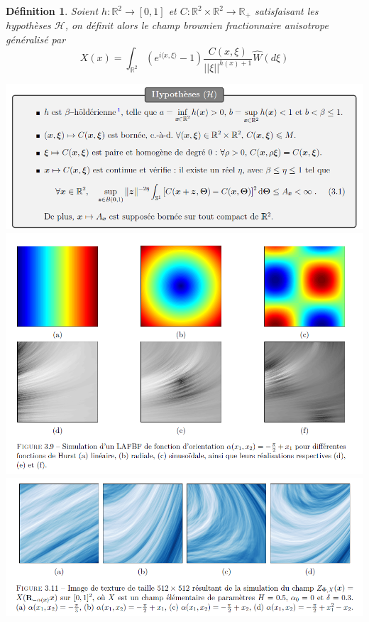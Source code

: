 \documentclass[11pt]{article} %
\newtheorem{definition}{Définition}[section]
\begin{document}
	\begin{definition}
		Soient $h:\mathbb{R}^2 \to [0,1]$ et $C:\mathbb{R}^2\times\mathbb{R}^2 \to\mathbb{R}_+$ satisfaisant les hypothèses $\mathcal{H}$, on définit alors le champ brownien fractionnaire anisotrope généralisé par
	\begin{equation}
		X(x) = \int_{\mathbb{R}^2} (e^{i\langle x, \xi\rangle} - 1) \frac{C(x,\xi)}{||\xi||^{h(x) + 1}} \hat{W}(d\xi)
	\end{equation}

	\end{definition}
\includegraphics[width=1.\textwidth]{hypH}
\includegraphics[width=1.\textwidth]{hurst_aniso}
\includegraphics[width=1.\textwidth]{deform_elem}
\end{document}
